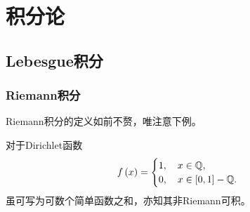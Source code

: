 \documentclass{ctexrep}
\begin{document}
\fi


\chapter{积分论}
  \section{Lebesgue积分}
  \subsection{Riemann积分}
  Riemann积分的定义如前不赘，唯注意下例。
  \begin{ex}
    对于Dirichlet函数
    \[
      f\left(x\right)=
      \begin{cases}
        1, \quad x \in \mathbb{Q}, \\
        0, \quad x \in \left[0,1\right]-\mathbb{Q}.
      \end{cases}
    \]
    虽可写为可数个简单函数之和，亦知其非Riemann可积。
  \end{ex}
\end{document}
